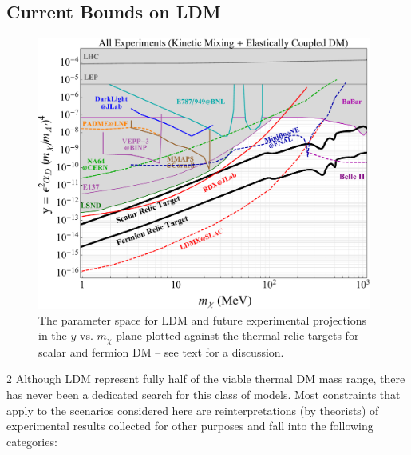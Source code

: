 \documentclass{article}
\begin{document}
\subsection{Current Bounds on LDM}


\begin{figure}[t!]
\center
\includegraphics[width=11cm]{everything.pdf}
\caption{ The parameter space for LDM and future experimental projections in the $y$ vs. $m_\chi$ plane plotted against
 the thermal relic targets for scalar and fermion DM -- see text for a discussion. }
\label{fig:mainplot}
\end{figure}

2
Although LDM represent fully half of the viable thermal DM mass range, there has never been a dedicated search
for this class of models. Most constraints that apply to the scenarios considered here are reinterpretations (by theorists)
of experimental results collected for other purposes and fall into the following categories:
\end{document}
